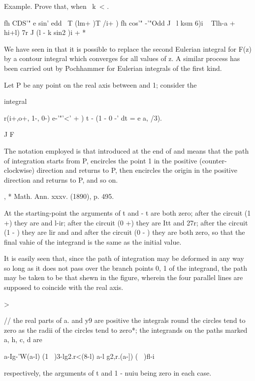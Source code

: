 Example. Prove that, when \ k\ < .\,

fh CDS'" e sin' edd \ T (lm+ )T /i+ ) fh cos'" -'"Odd J \ l ksm 6)i ~
Tlh-a + hi+l) 7r J (l - k sin2 )i + *



We have seen in  that it is possible to replace the second
Eulerian integral for F(z) by a contour integral which converges for
all values of z. A similar process has been carried out by Pochhammer
for Eulerian integrals of the first kind.

Let P be any point on the real axis between and 1; consider the

integral

r(i+,o+, 1-, 0-) e-'"'<' + ) t - (1 - 0 -' dt = e a, /3).

J F

The notation employed is that introduced at the end of  and
means that the path of integration starts from P, encircles the point
1 in the positive (counter-clockwise) direction and returns to P, then
encircles the origin in the positive direction and returns to P, and
so on.

, * Math. Ann. xxxv. (1890), p. 495.

%
%

At the starting-point the arguments of t and - t are both zero; after
the circuit (1 +) they are and l-ir; after the circuit (0 +) they are
Itt and 27r; after the circuit (1 - ) they are lir and and after the
circuit (0 - ) they are both zero, so that the final vahie of the
integrand is the same as the initial value.

It is easily seen that, since the path of integration may be deformed
in any way so long as it does not pass over the branch points 0, 1 of
the integrand, the path may be taken to be that shewn in the figure,
wherein the four parallel lines are supposed to coincide with the real
axis.

>

// the real parts of a. and y9 are positive the integrals round the
circles tend to zero as the radii of the circles tend to zero*; the
integrands on the paths marked a, h, c, d are

 a-Ig-'W(a-l) (1 \ )3-lg2.r<(8-l) a-l g2,r.(a-]) ( \ )fl-i

respectively, the arguments of t and 1 - nuiu being zero in each case.

